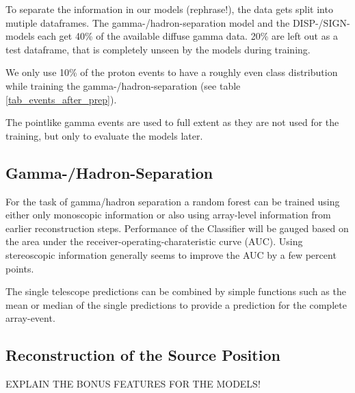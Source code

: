 To separate the information in our models (rephrase!), the data gets split into mutiple dataframes.
The gamma-/hadron-separation model and the DISP-/SIGN-models each get 
40\% of the available diffuse gamma data. 20\% are left out
as a test dataframe, that is completely unseen by the models during training.

We only use 10\% of the proton events to have a roughly even class distribution while training 
the gamma-/hadron-separation (see table \ref{tab_events_after_prep}).

The pointlike gamma events are used to full extent as they are not used for the training,
but only to evaluate the models later.

\subsection{Gamma-/Hadron-Separation}
For the task of gamma/hadron separation a random forest can be trained
using either only monoscopic information or also using array-level
information from earlier reconstruction steps.
Performance of the Classifier will be gauged based 
on the area under the receiver-operating-charateristic curve (AUC).
Using stereoscopic information
generally seems to improve the AUC by a few percent points.

The single telescope predictions can be combined by
simple functions such as the mean or median of the
single predictions to provide a prediction for the complete
array-event.





\subsection{Reconstruction of the Source Position}
\label{sec:source_position}
EXPLAIN THE BONUS FEATURES FOR THE MODELS!

